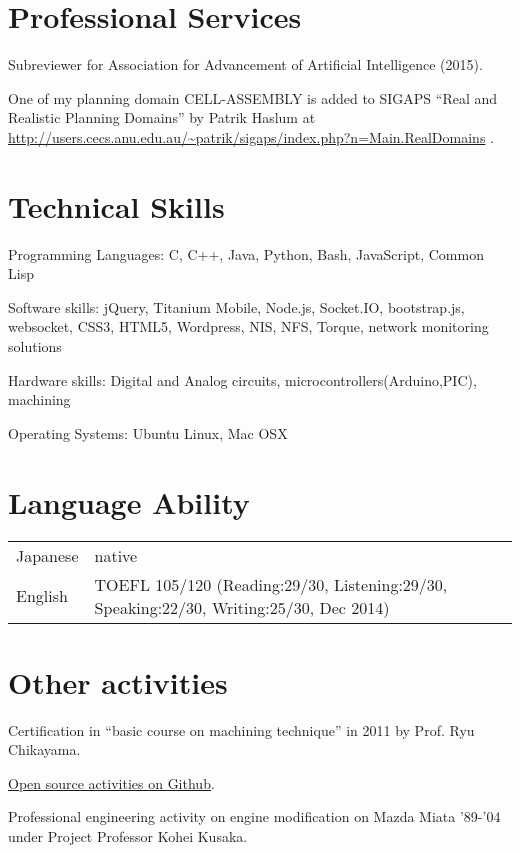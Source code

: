 \documentclass[a4paper]{article}
\begin{document}
\renewcommand{\refname}{Publications}

\let\uline\relax
\nocite{Asai2014}
\nocite{Asai2014b}
\nocite{Asai2015}




\section{Professional Services}

Subreviewer for Association for Advancement of Artificial Intelligence (2015).

One of my planning domain CELL-ASSEMBLY is added to SIGAPS ``Real and
Realistic Planning Domains'' by Patrik Haslum at
\url{http://users.cecs.anu.edu.au/~patrik/sigaps/index.php?n=Main.RealDomains}
.

\section{Technical Skills}

\begin{CV}
 \item[Programming Languages:] C, C++, Java, Python, Bash, JavaScript, Common Lisp
 \item[Software skills:] jQuery, Titanium Mobile,
 Node.js, Socket.IO, bootstrap.js, websocket, CSS3, HTML5, Wordpress, NIS, NFS,
 Torque, network monitoring solutions
 \item[Hardware skills:] Digital and Analog circuits, microcontrollers(Arduino,PIC), machining
 \item[Operating Systems:] Ubuntu Linux, Mac OSX
\end{CV}

\section{Language Ability}
\begin{table}[h] %
\begin{tabular}{ll}
Japanese & native \\
English  & TOEFL 105/120 (Reading:29/30, Listening:29/30, Speaking:22/30, Writing:25/30, Dec 2014)
\end{tabular}
\end{table}

\section{Other activities}

Certification in ``basic course on machining technique'' in 2011 by Prof. Ryu Chikayama.

\href{https://github.com/guicho271828}{Open source activities on Github}.

Professional engineering activity on engine modification
on Mazda Miata '89-'04 under Project Professor Kohei Kusaka.
\end{document}
